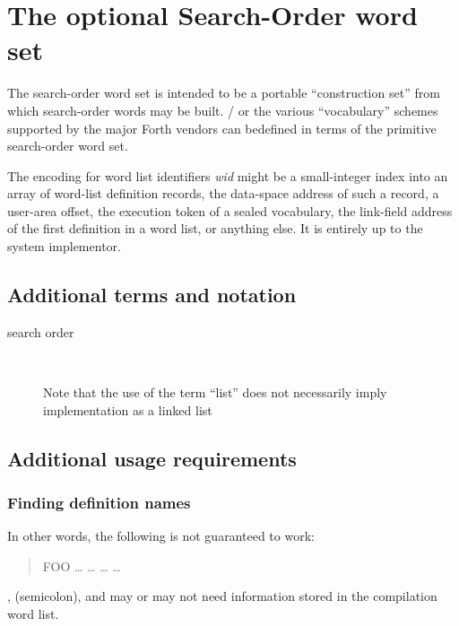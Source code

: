 

\section{The optional Search-Order word set} %
\label{rat:search}

The search-order word set is intended to be a portable ``construction
set'' from which search-order words may be built.  /
or the various ``vocabulary'' schemes supported by the major Forth
vendors can bedefined in terms of the primitive search-order word set.

The encoding for word list identifiers \emph{wid} might be a
small-integer index into an array of word-list definition records, the
data-space address of such a record, a user-area offset, the execution
token of a sealed vocabulary, the link-field address of the first definition
in a word list, or anything else. It is entirely up to the system implementor.

\setcounter{subsection}{1}
\subsection{Additional terms and notation} %

\begin{description}
\item[search order] ~

	Note that the use of the term ``list'' does not necessarily
	imply implementation as a linked list
\end{description}

\subsection{Additional usage requirements} %

\setcounter{subsubsection}{2}
\subsubsection{Finding definition names} %

In other words, the following is not guaranteed to work:

\begin{quote}\ttfamily
	\word{:} FOO {\ldots}
		\word{[} {\ldots}  \word{]}
		{\ldots}  {\ldots} \\
	\word{;} 
\end{quote}
, \word{;} (semicolon), and  may
or may not need information stored in the compilation word list.

